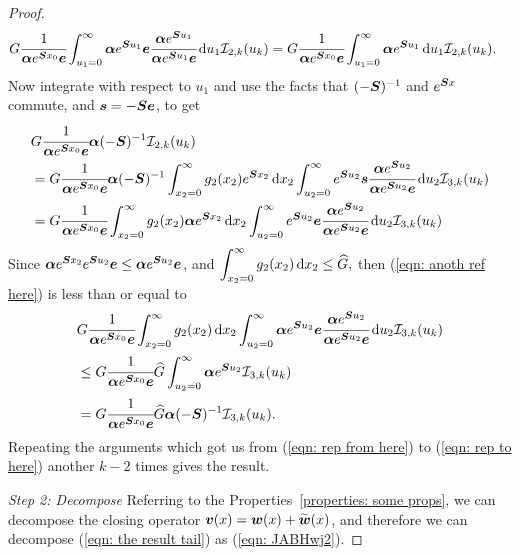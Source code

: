 \begin{proof}
	\begin{align}
		&G  \cfrac{1}{\boldsymbol \alpha e^{\boldsymbol{S}x_0}\boldsymbol e} \int_{u_1=0}^\infty \boldsymbol \alpha e^{\boldsymbol{S}u_1}\boldsymbol e \cfrac{\boldsymbol \alpha e^{\boldsymbol{S}u_1}}{\boldsymbol \alpha e^{\boldsymbol{S}u_1}\boldsymbol e}\, \mathrm{d} u_1 \mathcal I_{2,k}(u_k) \nonumber
		=G  \cfrac{1}{\boldsymbol \alpha e^{\boldsymbol{S} x_0 }\boldsymbol e} \int_{u_1=0}^\infty \boldsymbol \alpha e^{\boldsymbol{S}u_1}\, \mathrm{d} u_1 \mathcal I_{2,k}(u_k) . 
	\end{align}
	Now integrate with respect to \(u_1\) and use the facts that \((-\boldsymbol{S})^{-1}\) and \(e^{\boldsymbol{S}x}\) commute, and \(\boldsymbol s = - \boldsymbol{S} \boldsymbol e \), to get 
	\begin{align}
		& G  \cfrac{1}{\boldsymbol \alpha e^{\boldsymbol{S}x_0}\boldsymbol e} \boldsymbol \alpha (-\boldsymbol{S})^{-1}  \mathcal I_{2,k}(u_k) \label{eqn: rep from here}
		\\& = G  \cfrac{1}{\boldsymbol \alpha e^{\boldsymbol{S}x_0}\boldsymbol e}  \boldsymbol \alpha (-\boldsymbol{S})^{-1} \int_{x_2=0}^\infty g_2(x_2)  e^{\boldsymbol{S}x_2} \, \mathrm{d} x_2 \int_{u_2=0}^\infty e^{\boldsymbol{S}u_2}\boldsymbol s \cfrac{\boldsymbol \alpha e^{\boldsymbol{S}u_2}}{\boldsymbol \alpha e^{\boldsymbol{S}u_2}\boldsymbol e}\, \mathrm{d} u_2 \mathcal I_{3,k}(u_k)\nonumber 
		\\& = G  \cfrac{1}{\boldsymbol \alpha e^{\boldsymbol{S}x_0}\boldsymbol e}  \int_{x_2=0}^\infty g_2(x_2) \boldsymbol \alpha e^{\boldsymbol{S}x_2} \, \mathrm{d} x_2 \int_{u_2=0} ^\infty e^{\boldsymbol{S}u_2}\boldsymbol e \cfrac{\boldsymbol \alpha e^{\boldsymbol{S}u_2}}{\boldsymbol \alpha e^{\boldsymbol{S}u_2}\boldsymbol e}\, \mathrm{d} u_2 \mathcal I_{3,k}(u_k)\label{eqn: anoth ref here}
	\end{align}
	Since \(\boldsymbol \alpha e^{\boldsymbol{S}x_2}e^{\boldsymbol{S}u_2}\boldsymbol e \leq \boldsymbol \alpha e^{\boldsymbol{S}u_2}\boldsymbol e \), and \(\displaystyle \int_{x_2=0}^\infty g_2(x_2)\, \mathrm{d} x_2\leq \widehat G,\) then (\ref{eqn: anoth ref here}) is less than or equal to 
	\begin{align}
		& G  \cfrac{1}{\boldsymbol \alpha e^{\boldsymbol{S}x_0}\boldsymbol e}  \int_{x_2=0}^\infty g_2(x_2) \, \mathrm{d} x_2 \int_{u_2=0}^\infty \boldsymbol \alpha e^{\boldsymbol{S}u_2}\boldsymbol e \cfrac{\boldsymbol \alpha e^{\boldsymbol{S}u_2}}{\boldsymbol \alpha e^{\boldsymbol{S}u_2}\boldsymbol e}\, \mathrm{d} u_2 \mathcal I_{3,k}(u_k) \nonumber
		\\& \leq G  \cfrac{1}{\boldsymbol \alpha e^{\boldsymbol{S} x_0 }\boldsymbol e}  \widehat G  \int_{u_2=0}^\infty \boldsymbol \alpha e^{\boldsymbol{S}u_2} \mathcal I_{3,k}(u_k) \nonumber
		\\& =G  \cfrac{1}{\boldsymbol \alpha e^{\boldsymbol{S} x_0 }\boldsymbol e}  \widehat G \boldsymbol \alpha (-\boldsymbol S)^{-1} \mathcal I_{3,k}(u_k).  \label{eqn: rep to here}
	\end{align}
	Repeating the arguments which got us from (\ref{eqn: rep from here}) to (\ref{eqn: rep to here}) another \(k-2\) times gives the result.

\emph{Step 2: Decompose}
Referring to the Properties~\ref{properties: some props}, we can decompose the closing operator \(\boldsymbol v(x)=\boldsymbol w(x) + \widetilde{\boldsymbol w}(x)\), and therefore we can decompose (\ref{eqn: the result tail}) as (\ref{eqn: JABHwj2}).


\end{proof}
